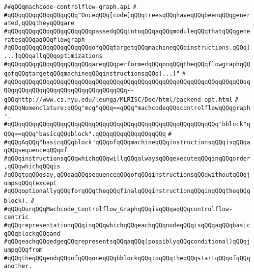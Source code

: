 \label{src/lib/compiler/back/low/mcg/machcode-controlflow-graph.api}
\verb|##qQQqmachcode-controlflow-graph.api|\newline
\verb|#|\newline
\verb|#qQQqqQQqqQQqqQQqqQQq"OnceqQQq[code]qQQqtreesqQQqhaveqQQqbeenqQQqgenerated,qQQqtheyqQQqare|\newline
\verb|#qQQqqQQqqQQqqQQqqQQqqQQqpassedqQQqintoqQQqaqQQqmoduleqQQqthatqQQqgeneratesqQQqaqQQqflowgraph|\newline
\verb|#qQQqqQQqqQQqqQQqqQQqqQQqofqQQqtargetqQQqmachineqQQqinstructions.qQQq[...]qQQqallqQQqoptimizations|\newline
\verb|#qQQqqQQqqQQqqQQqqQQqqQQqareqQQqperformedqQQqonqQQqtheqQQqflowgraphqQQqofqQQqtargetqQQqmachineqQQqinstructionsqQQq[...]"|\newline
\verb|#|\newline
\verb|#qQQqqQQqqQQqqQQqqQQqqQQqqQQqqQQqqQQqqQQqqQQqqQQqqQQqqQQqqQQqqQQqqQQqqQQqqQQqqQQqqQQqqQQqqQQqqQQqqQQqqQQq--qQQqhttp://www.cs.nyu.edu/leunga/MLRISC/Doc/html/backend-opt.html|\newline
\verb|#|\newline
\verb|#qQQqNomenclature:qQQq"mcg"qQQq==qQQq"machcodeqQQqcontrolflowqQQqgraph".|\newline
\verb|#qQQqqQQqqQQqqQQqqQQqqQQqqQQqqQQqqQQqqQQqqQQqqQQqqQQqqQQqqQQq"bblock"qQQq==qQQq"basicqQQqblock".qQQqqQQqqQQqqQQqqQQq|\newline
\verb|#|\newline
\verb|#qQQqAqQQq"basicqQQqblock"qQQqofqQQqmachineqQQqinstructionsqQQqisqQQqaqQQqsequenceqQQqof|\newline
\verb|#qQQqinstructionsqQQqwhichqQQqwillqQQqalwaysqQQqexecuteqQQqinqQQqorder,qQQqwhichqQQqis|\newline
\verb|#qQQqtoqQQqsay,qQQqaqQQqsequenceqQQqofqQQqinstructionsqQQqwithoutqQQqjumpsqQQq(except|\newline
\verb|#qQQqoptionallyqQQqforqQQqtheqQQqfinalqQQqinstructionqQQqinqQQqtheqQQqblock).|\newline
\verb|#|\newline
\verb|#qQQqOurqQQqMachcode_Controlflow_GraphqQQqisqQQqaqQQqcontrolflow-centric|\newline
\verb|#qQQqrepresentationqQQqinqQQqwhichqQQqeachqQQqnodeqQQqisqQQqaqQQqbasicqQQqblockqQQqand|\newline
\verb|#qQQqeachqQQqedgeqQQqrepresentsqQQqaqQQq(possiblyqQQqconditional)qQQqjumpqQQqfrom|\newline
\verb|#qQQqtheqQQqendqQQqofqQQqoneqQQqbblockqQQqtoqQQqtheqQQqstartqQQqofqQQqanother.|\newline
